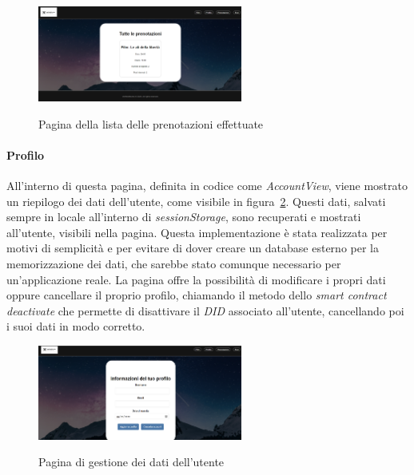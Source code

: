 \begin{figure}[ht]
    \centering
    \includegraphics[width=0.6\textwidth, alt={Schermata della pagina di lista delle prenotazioni effettuate}]{immagini/frontend/movie-booking-list.png}
    \caption{Pagina della lista delle prenotazioni effettuate}\label{fig:lista-prenotazioni}
\end{figure}

\newpage
\paragraph{Profilo}\label{par:profilo}

All'interno di questa pagina, definita in codice come \textit{AccountView}, viene mostrato un riepilogo dei dati dell'utente, come visibile in figura~\ref{fig:profilo}.
Questi dati, salvati sempre in locale all'interno di \textit{sessionStorage}, sono recuperati e mostrati all'utente, visibili nella pagina. Questa implementazione è stata realizzata per motivi di semplicità 
e per evitare di dover creare un database esterno per la memorizzazione dei dati, che sarebbe stato comunque necessario per un'applicazione reale.
La pagina offre la possibilità di modificare i propri dati oppure cancellare il proprio profilo, chiamando il metodo dello \textit{smart contract} \textit{deactivate}
che permette di disattivare il \textit{DID} associato all'utente, cancellando poi i suoi dati in modo corretto.

\begin{figure}[ht]
    \centering
    \includegraphics[width=0.6\textwidth, alt={Schermata della pagina di gestione del profilo dell'utente}]{immagini/frontend/account.png}
    \caption{Pagina di gestione dei dati dell'utente}\label{fig:profilo}
\end{figure}

